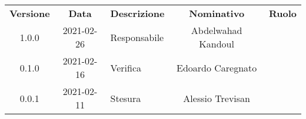 {
    \renewcommand{\arraystretch}{1.5}
    \centering
    \begin{longtable}{ c c  C{4cm}  c  c }
        \rowcolor{\primaryColor}
        \textcolor{\secondaryColor}{
        \textbf{Versione}}     & \textcolor{\secondaryColor}{\textbf{Data}}       & \textcolor{\secondaryColor}
        {\textbf{Descrizione}} & \textcolor{\secondaryColor}{\textbf{Nominativo}} & \textcolor{\secondaryColor}{\textbf{Ruolo}}                          \\


        1.0.0                  & 2021-02-26                                       & Responsabile                                & Abdelwahad Kandoul & \responsabile{} \\
        0.1.0                  & 2021-02-16                                       & Verifica                                    & Edoardo Caregnato & \verificatore{} \\
        0.0.1                  & 2021-02-11                                       & Stesura                          & Alessio Trevisan & \redattore{}    \\
    \end{longtable}
}